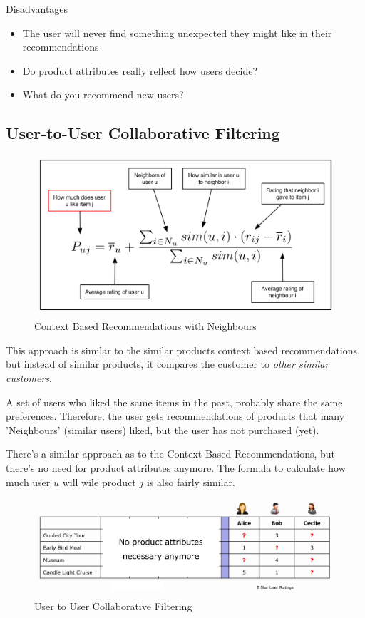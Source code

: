 \documentclass[11pt]{article}
\begin{document}
Disadvantages

\begin{itemize}
    \item The user will never find something unexpected they might like in their recommendations
    \item Do product attributes really reflect how users decide?
    \item What do you recommend new users?
\end{itemize}


\subsection{User-to-User Collaborative Filtering}

\begin{figure}
    \centering
    \includegraphics[keepaspectratio=true,height=10\baselineskip]{user_similarity.png}
    \caption{Context Based Recommendations with Neighbours}
    \label{fig:neighbours}
\end{figure}
This approach is similar to the similar products context based recommendations, but instead of similar products, it compares the customer to \textit{other similar customers}.

A set of users who liked the same items in the past, probably share the same preferences. Therefore, the user gets recommendations of products that many 'Neighbours' (similar users) liked, but the user has not purchased (yet).


There's a similar approach as to the Context-Based Recommendations, but there's no need for product attributes anymore. The formula to calculate how much user $u$ will wile product $j$ is also fairly similar.

\begin{figure}[htb!]
    \centering
    \includegraphics[keepaspectratio=true, width=\linewidth]{user_to_user_collaborative_filtering.png}
    \caption{User to User Collaborative Filtering}
    \label{fig:user_to_user_collaborative_filtering}
\end{figure}
\end{document}
